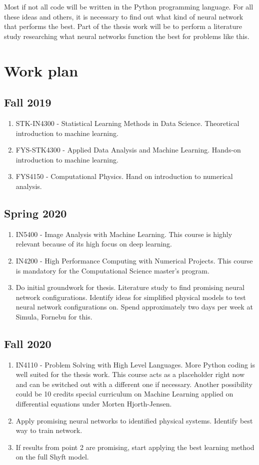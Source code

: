 \documentclass[a4paper,12pt,english]{article}
\begin{document}
Most if not all code will be written in the Python programming language. For all these ideas and others, it is necessary to find out what kind of neural network that performs the best. Part of the thesis work will be to perform a literature study researching what neural networks function the best for problems like this. 
\section{Work plan}
\subsection{Fall 2019}
\begin{enumerate}
\item STK-IN4300 - Statistical Learning Methods in Data Science. Theoretical introduction to machine learning.
\item FYS-STK4300 - Applied Data Analysis and Machine Learning. Hands-on introduction to machine learning.
\item FYS4150 - Computational Physics. Hand on introduction to numerical analysis. 
\end{enumerate}
\subsection{Spring 2020}
\begin{enumerate}
\item IN5400 - Image Analysis with Machine Learning. This course is highly relevant because of its high focus on deep learning.
\item IN4200 - High Performance Computing with Numerical Projects. This course is mandatory for the Computational Science master's program.
\item Do initial groundwork for thesis. Literature study to find promising neural network configurations. Identify ideas for simplified physical models to test neural network configurations on. Spend approximately two days per week at Simula, Fornebu for this.
\end{enumerate}
\subsection{Fall 2020}
\begin{enumerate}
\item IN4110 - Problem Solving with High Level Languages. More Python coding is well suited for the thesis work. This course acts as a placeholder right now and can be switched out with a different one if necessary. Another possibility could be 10 credits special curriculum on Machine Learning applied on differential equations under Morten Hjorth-Jensen.
\item Apply promising neural networks to identified physical systems. Identify best way to train network.
\item If results from point 2 are promising, start applying the best learning method on the full Shyft model.
\end{enumerate}
\end{document}

